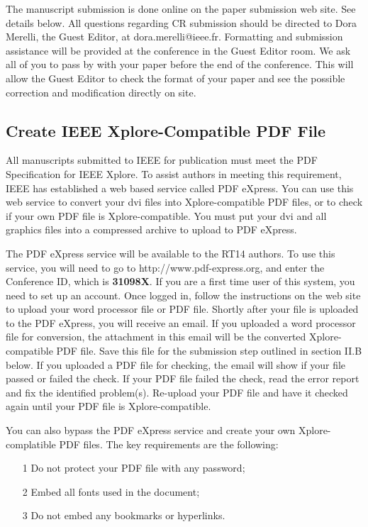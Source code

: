 \documentclass[journal]{IEEEtran}
\begin{document}
The manuscript submission is done online on the paper submission web site.  See details below. All questions regarding CR submission should be directed to Dora Merelli, the Guest Editor, at dora.merelli@ieee.fr. Formatting and submission assistance will be provided at the conference in the Guest Editor room. We ask all of you to pass by with your paper before the end of the conference. This will allow the Guest Editor to check the format of your paper and see the possible correction and modification directly on site.

\subsection{Create IEEE Xplore-Compatible PDF File}

All manuscripts submitted to IEEE for publication must meet the PDF Specification for IEEE Xplore\cite{IEEEPDFRequirement401}. To assist authors in meeting this requirement, IEEE has established a web based service called PDF eXpress. You can use this web service to convert your dvi  files into Xplore-compatible PDF files, or to check if your own PDF file is Xplore-compatible. You must put your dvi and all graphics files into a compressed archive to upload to PDF eXpress.

The PDF eXpress service will be available to the RT14 authors. To use this service, you will need to go to http://www.pdf-express.org, and enter the Conference ID, which is \textbf{31098X}. If you are a first time user of this system, you need to set up an account.  Once logged in, follow the instructions on the web site to upload your word processor file or PDF file.  Shortly after your file is uploaded to the PDF eXpress, you will receive an email. If you uploaded a word processor file for conversion, the attachment in this email will be the converted Xplore-compatible PDF file.  Save this file for the submission step outlined in section II.B below.  If you uploaded a PDF file for checking, the email will show if your file passed or failed the check.  If your PDF file failed the check, read the error report and fix the identified problem(s).  Re-upload your PDF file and have it checked again until your PDF file is Xplore-compatible.

You can also bypass the PDF eXpress service and create your own Xplore-complatible PDF files.  The key requirements are the following:
\begin{itemize}
\item[1]	Do not protect your PDF file with any password;
\item[2]	Embed all fonts used in the document;
\item[3]	Do not embed any bookmarks or hyperlinks.
\end{itemize}
\end{document}
